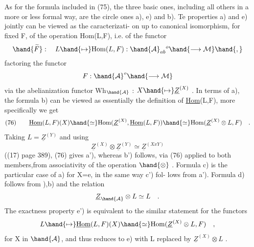 
As for the formula included in (75), the three basic ones, including
all others in a more or less formal way, are the circle ones a), e) and
b). Te properties a) and e) jointly can be viewed as the caracterizati-%
on up to canonical isomorphism, for fixed F, of the  operation
Hom(L,F), i.e. of the functor 
\[ \hand{\widetilde{F}} : \quad L \hand{\mapsto} \mathrm{Hom}(L,F) : \hand{\mathcal{A}}_{ab}{}^{o} \hand{\longrightarrow \mathcal{M}}\hand{,} \]
factoring the functor
\[ F : \hand{\mathcal{A}}^{o} \hand{\longrightarrow \mathcal{M}} \]
via the abelianization functor Wh$_{\hand{\mathcal{A}}}$ : $X \hand{\mapsto} \underline{Z}^{(X)}$ . In terms of a), the
formula b) can be viewed as essentially the definition of \underline{Hom}(L,F), more
specifically we get
\[ (76) \qquad \underline{\mathrm{Hom}}(L,F)(X) \hand{\simeq} \mathrm{Hom}(\underline{Z}^{(X)},\underline{\mathrm{Hom}}(L,F)) \hand{\simeq} \mathrm{Hom}(\underline{Z}^{(X)}\otimes L,F) \quad . \]
Taking $L = \underline{Z}^{(Y)}$ and using
\[ \underline{Z}^{(X)} \otimes \underline{Z}^{(Y)} \simeq \underline{Z}^{(XxY)} \]
((17) page 389), (76)  gives a'), whereas b') follows,
via (76) applied to both members,from associativity of the operation $\hand{\otimes}$ .
Formula c) is the particular case of a) for X=e, in the same way c') fol-%
lows from a'). Formula d) follows from ),b) and the relation
\[ \underline{Z}_{\hand{\mathcal{A}}} \otimes L \simeq L \quad . \]
The exactness property e')  is equivalent to the similar statement
for the functors
\[ L \hand{\mapsto} \underline{\mathrm{Hom}}(L,F)(X) \hand{\simeq} \mathrm{Hom}(\underline{Z}^{(X)}\otimes L,F) \quad , \]
for X in $\hand{\mathcal{A}}$, and thus reduces to e) with L replaced by $\underline{Z}^{(X)}\otimes L$ .

